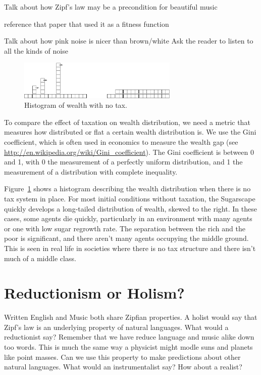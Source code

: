 \documentclass[10pt]{book}
\begin{document}
Talk about how Zipf's law may be a precondition for beautiful music

reference that paper that used it as a fitness function

Talk about how pink noise is nicer than brown/white
Ask the reader to listen to all the kinds of noise

\begin{figure}[ht]
\centerline{\includegraphics[width=3.0in]{figs/towers}}
\caption{Histogram of wealth with no tax.\label{fig.notax}}
\end{figure}

To compare the effect of taxation on wealth distribution, we need a
metric that measures how distributed or flat a certain wealth
distribution is.  We use the Gini coefficient, which is often used in
economics to measure the wealth gap (see
\url{http://en.wikipedia.org/wiki/Gini_coefficient}). The Gini
coefficient is between 0 and 1, with 0 the measurement of a perfectly
uniform distribution, and 1 the measurement of a distribution with
complete inequality.

Figure~\ref{fig.notax} shows a histogram describing the wealth
distribution when there is no tax system in place. For most initial
conditions without taxation, the Sugarscape quickly develops a
long-tailed distribution of wealth, skewed to the right. In these
cases, some agents die quickly, particularly in an environment with
many agents or one with low sugar regrowth rate. The separation
between the rich and the poor is significant, and there aren't many
agents occupying the middle ground. This is seen in real life in
societies where there is no tax structure and there isn't much of a
middle class.


\section{Reductionism or Holism?}

Written English and Music both share Zipfian properties. A holist would say that Zipf's law is an underlying property of natural languages. What would a reductionist say? Remember that we have reduce language and music alike down too words. This is much the same way a physicist might modle suns and planets like point masses. Can we use this property to make predictions about other natural languages. What would an instrumentalist say? How about a realist?
\end{document}
